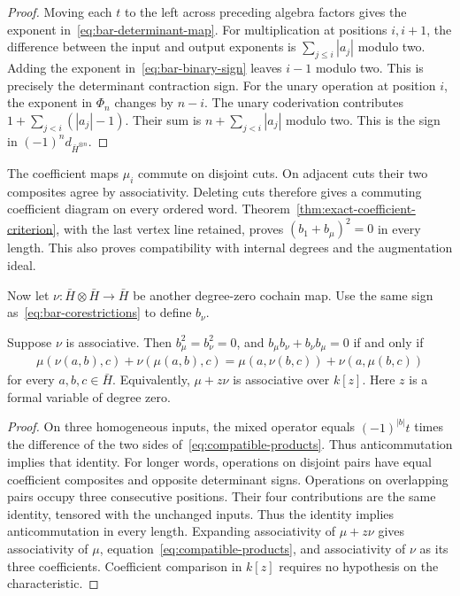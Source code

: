 \begin{proof}
Moving each $t$ to the left across preceding algebra factors gives the exponent in~\eqref{eq:bar-determinant-map}.
For multiplication at positions $i,i+1$, the difference between the input and output exponents is
$\sum_{j\leq i}|a_j|$ modulo two.
Adding the exponent in~\eqref{eq:bar-binary-sign} leaves $i-1$ modulo two.
This is precisely the determinant contraction sign.
For the unary operation at position $i$, the exponent in $\Phi_n$ changes by $n-i$.
The unary coderivation contributes
$1+\sum_{j<i}(|a_j|-1)$.
Their sum is $n+\sum_{j<i}|a_j|$ modulo two.
This is the sign in $(-1)^n d_{\bar H^{\otimes n}}$.
\end{proof}

The coefficient maps $\mu_i$ commute on disjoint cuts.
On adjacent cuts their two composites agree by associativity.
Deleting cuts therefore gives a commuting coefficient diagram on every ordered word.
Theorem~\ref{thm:exact-coefficient-criterion}, with the last vertex line retained, proves
$(b_1+b_\mu)^2=0$ in every length.
This also proves compatibility with internal degrees and the augmentation ideal.

Now let $\nu:\bar H\otimes\bar H\to\bar H$ be another degree-zero cochain map.
Use the same sign as~\eqref{eq:bar-corestrictions} to define $b_\nu$.

\begin{theorem}
\label{thm:two-associative-contractions}
Suppose $\nu$ is associative.
Then $b_\mu^2=b_\nu^2=0$, and $b_\mu b_\nu+b_\nu b_\mu=0$ if and only if
\begin{align}
\label{eq:compatible-products}
\mu(\nu(a,b),c)+\nu(\mu(a,b),c)
=\mu(a,\nu(b,c))+\nu(a,\mu(b,c))
\end{align}
for every $a,b,c\in\bar H$.
Equivalently, $\mu+z\nu$ is associative over $k[z]$.
Here $z$ is a formal variable of degree zero.
\end{theorem}

\begin{proof}
On three homogeneous inputs, the mixed operator equals $(-1)^{|b|}t$ times the difference of the two sides of~\eqref{eq:compatible-products}.
Thus anticommutation implies that identity.
For longer words, operations on disjoint pairs have equal coefficient composites and opposite determinant signs.
Operations on overlapping pairs occupy three consecutive positions.
Their four contributions are the same identity, tensored with the unchanged inputs.
Thus the identity implies anticommutation in every length.
Expanding associativity of $\mu+z\nu$ gives associativity of $\mu$, equation~\eqref{eq:compatible-products}, and associativity of $\nu$ as its three coefficients.
Coefficient comparison in $k[z]$ requires no hypothesis on the characteristic.
\end{proof}

